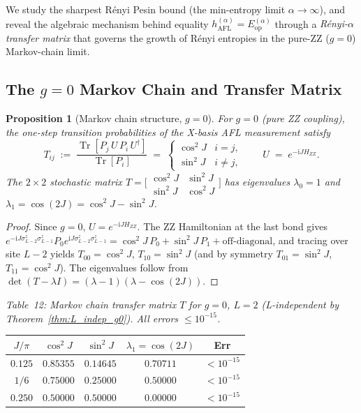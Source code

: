 \documentclass[12pt,a4paper]{article}
\newtheorem{proposition}[theorem]{Proposition}
\begin{document}
We study the sharpest Rényi Pesin bound (the min-entropy limit $\alpha\to\infty$),
and reveal the algebraic mechanism behind equality $h^{(\alpha)}_\mathrm{AFL}=E^{(\alpha)}_\mathrm{op}$
through a \emph{Rényi-$\alpha$ transfer matrix} that governs the growth of Rényi entropies
in the pure-ZZ ($g=0$) Markov-chain limit.

\subsection{The $g=0$ Markov Chain and Transfer Matrix}

\begin{proposition}[Markov chain structure, $g=0$]\label{prop:markov_g0}
For $g=0$ (pure ZZ coupling), the one-step transition probabilities of the X-basis
AFL measurement satisfy
\begin{equation}\label{eq:T_matrix}
  T_{ij} \;:=\;
  \frac{\operatorname{Tr}[P_j\,U\,P_i\,U^\dagger]}{\operatorname{Tr}[P_i]}
  \;=\;\begin{cases}
    \cos^2\!J & i=j,\\
    \sin^2\!J & i\ne j,
  \end{cases}
  \qquad U \;=\; e^{-\mathrm{i}J H_{ZZ}}.
\end{equation}
The $2\times 2$ stochastic matrix $T = \bigl[\begin{smallmatrix}\cos^2\!J & \sin^2\!J\\
\sin^2\!J & \cos^2\!J\end{smallmatrix}\bigr]$ has eigenvalues $\lambda_0=1$ and
$\lambda_1 = \cos(2J) = \cos^2\!J - \sin^2\!J$.
\end{proposition}

\begin{proof}
Since $g=0$, $U = e^{-\mathrm{i}J H_{ZZ}}$.  The ZZ Hamiltonian at the last bond
gives $e^{-\mathrm{i}J\sigma^z_{L-2}\sigma^z_{L-1}} P_0 e^{\mathrm{i}J\sigma^z_{L-2}\sigma^z_{L-1}}
= \cos^2\!J\, P_0 + \sin^2\!J\, P_1 + \text{off-diagonal}$,
and tracing over site $L-2$ yields $T_{00} = \cos^2\!J$, $T_{10}=\sin^2\!J$ (and by
symmetry $T_{01}=\sin^2\!J$, $T_{11}=\cos^2\!J$).  The eigenvalues follow from
$\det(T-\lambda I) = (\lambda-1)(\lambda-\cos(2J))$.
\end{proof}

\noindent\textit{Table~12: Markov chain transfer matrix $T$ for $g=0$, $L=2$
(L-independent by Theorem~\ref{thm:L_indep_g0}).  All errors $\le 10^{-15}$.}

\begin{center}
\begin{tabular}{@{}ccccc@{}}
\toprule
$J/\pi$ & $\cos^2\!J$ & $\sin^2\!J$ & $\lambda_1=\cos(2J)$ & Err\\
\midrule
$0.125$ & $0.85355$ & $0.14645$ & $0.70711$ & $<10^{-15}$\\
$1/6$   & $0.75000$ & $0.25000$ & $0.50000$ & $<10^{-15}$\\
$0.250$ & $0.50000$ & $0.50000$ & $0.00000$ & $<10^{-15}$\\
\bottomrule
\end{tabular}
\end{center}
\end{document}
